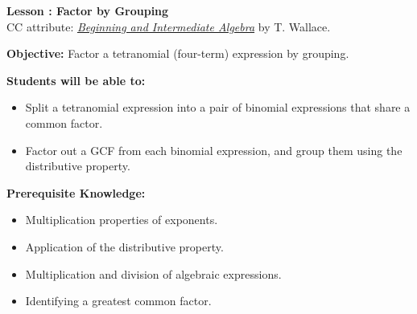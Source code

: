 \documentclass[12pt]{article}
\theoremstyle{definition}
\begin{document}
{\bf \large Lesson : Factor by Grouping}\label{les:factoring_grouping}
\\ CC attribute: \href{http://www.wallace.ccfaculty.org/book/book.html}{\it{Beginning and Intermediate Algebra}} by T. Wallace. 
\hfill \doclicenseImage[imagewidth=5em]\\
\par
{\bf Objective:} Factor a tetranomial (four-term) expression by grouping.\\
\par
{\bf Students will be able to:}
\begin{itemize}
	\item Split a tetranomial expression into a pair of binomial  expressions that share a common factor.
	\item Factor out a GCF from each binomial expression, and group them using the distributive property.
\end{itemize}
{\bf Prerequisite Knowledge:}
\begin{itemize}
	\item Multiplication properties of exponents.
	\item Application of the distributive property.
	\item Multiplication and division of algebraic expressions.
	\item Identifying a greatest common factor.
\end{itemize}
\hrulefill
\end{document}
